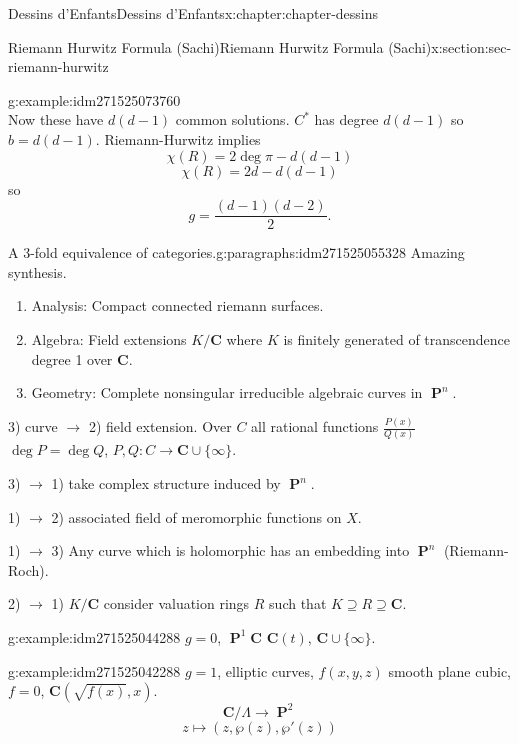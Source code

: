 \documentclass[oneside,10pt,]{book}
\numberwithin{equation}{section}
\newcommand{\CC}{\mathbf{C}}
\DeclareMathOperator{\PP}{\mathbf{P}}
\begin{document}
\begin{chapterptx}{Dessins d'Enfants}{}{Dessins d'Enfants}{}{}{x:chapter:chapter-dessins}
\begin{sectionptx}{Riemann Hurwitz Formula (Sachi)}{}{Riemann Hurwitz Formula (Sachi)}{}{}{x:section:sec-riemann-hurwitz}
\begin{example}{}{g:example:idm271525073760}
\begin{equation*}
\end{equation*}
Now these have \(d(d-1)\) common solutions. \(C^*\) has degree \(d(d-1)\) so \(b = d(d-1)\). Riemann-Hurwitz implies%
\begin{equation*}
\chi(R) = 2\deg \pi - d(d-1)
\end{equation*}
%
\begin{equation*}
\chi(R) = 2d - d(d-1)
\end{equation*}
so%
\begin{equation*}
g=  \frac{(d-1)(d-2)}{2}\text{.}
\end{equation*}
%
\end{example}
\begin{paragraphs}{A 3-fold equivalence of categories.}{g:paragraphs:idm271525055328}%
Amazing synthesis.%
\begin{enumerate}
\item{}Analysis: Compact connected riemann surfaces.%
\item{}Algebra: Field extensions \(K/\CC\) where \(K\) is finitely generated of transcendence degree 1 over \(\CC\).%
\item{}Geometry: Complete nonsingular irreducible algebraic curves in \(\PP^n\).%
\end{enumerate}
%
\par
3) curve \(\to\) 2) field extension. Over \(C\) all rational functions \(\frac{P(x)}{Q(x)}\) \(\deg P= \deg Q\), \(P,Q \colon C\to \CC \cup \{\infty\}\).%
\par
3) \(\to\) 1) take complex structure induced by \(\PP^n\).%
\par
1) \(\to\) 2) associated field of meromorphic functions on \(X\).%
\par
1) \(\to\) 3) Any curve which is holomorphic has an embedding into \(\PP^n\) (Riemann-Roch).%
\par
2) \(\to\) 1) \(K/\CC\) consider valuation rings \(R\) such that \(K\supseteq R\supseteq \CC\).%
\begin{example}{}{g:example:idm271525044288}%
\(g =0\), \(\PP^1 \CC\) \(\CC(t)\), \(\CC\cup \{\infty\}\).%
\end{example}
\begin{example}{}{g:example:idm271525042288}%
\(g =1\), elliptic curves, \(f(x,y,z)\) smooth plane cubic, \(f= 0\), \(\CC(\sqrt{f(x)}, x)\).%
\begin{equation*}
\CC/\Lambda \to \PP^2
\end{equation*}
%
\begin{equation*}
z\mapsto (z,\wp(z), \wp'(z))

\end{equation*}
\end{example}
\end{paragraphs}
\end{sectionptx}
\end{chapterptx}
\end{document}
